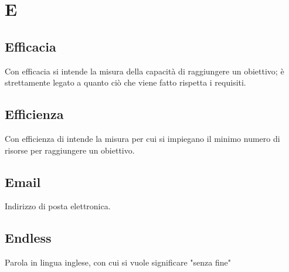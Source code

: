 \section{E}
	\subsection{Efficacia}  
		Con efficacia si intende la misura della capacità di raggiungere un obiettivo; è strettamente legato a quanto ciò che viene fatto rispetta i requisiti.
	\subsection{Efficienza}  
		Con efficienza di intende la misura per cui si impiegano il minimo numero di risorse per raggiungere un obiettivo.
	\subsection{Email}
		Indirizzo di posta elettronica.
	\subsection{Endless}  
		Parola in lingua inglese, con cui si vuole significare "senza fine"


\newpage
